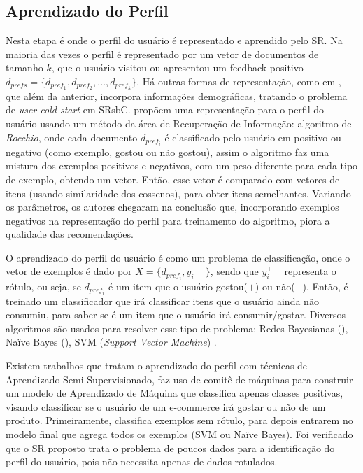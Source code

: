 \documentclass[normaltoc, espacoumemeio, pnumromarab,ruledheader]{abnt}
\begin{document}
\subsection{Aprendizado do Perfil}
\label{subsec:perfil}

Nesta etapa é onde o perfil do usuário é representado e aprendido pelo SR. Na maioria das vezes o perfil é representado por um vetor de documentos de tamanho $k$, que o usuário visitou ou apresentou um feedback positivo $d_{prefs} = \{d_{pref_1}, d_{pref_2}, \dots, d_{pref_k}\}$.
Há outras formas de representação, como em , que além da anterior, incorpora informações demográficas, tratando o problema de \textit{user cold-start} em SRsbC.
 propõem uma representação para o perfil do usuário usando um método da área de Recuperação de Informação: algoritmo de \textit{Rocchio}, onde cada documento $d_{pref_i}$ é classificado pelo usuário em positivo ou negativo (como exemplo, gostou ou não gostou), assim o algoritmo faz uma mistura dos exemplos positivos e negativos, com um peso diferente para cada tipo de exemplo, obtendo um vetor.
Então, esse vetor é comparado com vetores de itens (usando similaridade dos cossenos), para obter itens semelhantes.
Variando os parâmetros, os autores chegaram na conclusão que, incorporando exemplos negativos na representação do perfil para treinamento do algoritmo, piora a qualidade das recomendações.

O aprendizado do perfil do usuário é como um problema de classificação, onde o vetor de exemplos é dado por $X = \{d_{pref_i}, y^{+-}_i\}$, sendo que $y^{+-}_i$ representa o rótulo, ou seja, se $d_{pref_i}$ é um item que o usuário gostou($+$) ou não($-$).
Então, é treinado um classificador que irá classificar itens que o usuário ainda não consumiu, para saber se é um item que o usuário irá consumir/gostar.
Diversos algoritmos são usados para resolver esse tipo de problema: Redes Bayesianas (\cite{Yeung2012, Cleger2012}), Naïve Bayes (\cite{Lee2012, Semeraro2012}), SVM (\textit{Support Vector Machine}) \cite{Tantanasiriwong2012, Lee2012}.

Existem trabalhos que tratam o aprendizado do perfil com técnicas de Aprendizado Semi-Supervisionado,  faz uso de comitê de máquinas para construir um modelo de Aprendizado de Máquina que classifica apenas classes positivas, visando classificar se o usuário de um e-commerce irá gostar ou não de um produto. Primeiramente, classifica exemplos sem rótulo, para depois entrarem no modelo final que agrega todos os exemplos (SVM ou Naïve Bayes).
Foi verificado que o SR proposto trata o problema de poucos dados para a identificação do perfil do usuário, pois não necessita apenas de dados rotulados.
\end{document}
